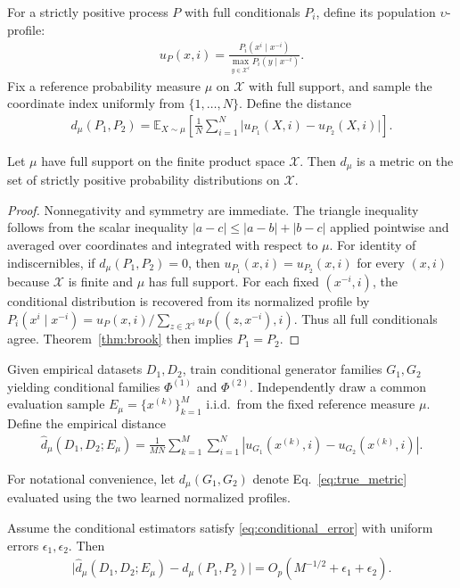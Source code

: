 \documentclass[runningheads]{llncs}
\def\EQSP{3pt}
\newcommand{\cgather}[2][\EQSP]{\begingroup\setlength\abovedisplayskip{#1}\setlength\belowdisplayskip{#1}\begin{gather} #2 \end{gather}\endgroup\noindent}
\begin{document}
For a strictly positive process $P$ with full conditionals $P_i$, define its population $\upsilon$-profile:
\cgather{
u_P(x,i)
=
\frac{
P_i(x^i\mid x^{-i})
}{
\max_{y\in\mathcal{X}^i} P_i(y\mid x^{-i})
}.
}
Fix a reference probability measure $\mu$ on $\mathcal{X}$ with full
support, and sample the coordinate index uniformly from
$\{1,\dots,N\}$. Define the distance
\cgather{
d_{\mu}(P_1,P_2)
=
\mathbb{E}_{X\sim\mu}
\left[
\frac{1}{N}\sum_{i=1}^{N}
\lvert u_{P_1}(X,i) - u_{P_2}(X,i)\rvert
\right].
\label{eq:true_metric}
}

\begin{theorem}
Let $\mu$ have full support on the finite product space $\mathcal{X}$.
Then $d_{\mu}$ is a metric on the set of strictly positive probability
distributions on $\mathcal{X}$.
\end{theorem}

\begin{proof}
Nonnegativity and symmetry are immediate. The triangle inequality follows from the scalar inequality
$\lvert a-c\rvert \le \lvert a-b\rvert + \lvert b-c\rvert$ applied pointwise and averaged over coordinates and integrated with respect to $\mu$.
For identity of indiscernibles, if $d_{\mu}(P_1,P_2)=0$, then
$u_{P_1}(x,i)=u_{P_2}(x,i)$ for every $(x,i)$ because $\mathcal{X}$ is
finite and $\mu$ has full support. For each fixed
$(x^{-i},i)$, the conditional distribution is recovered from its normalized
profile by
$P_i(x^i\mid x^{-i})=u_P(x,i)/\sum_{z\in\mathcal{X}^i}u_P((z,x^{-i}),i)$.
Thus all full conditionals agree. Theorem~\ref{thm:brook} then implies $P_1=P_2$.
\end{proof}

Given empirical datasets $D_1,D_2$, train conditional generator families
$G_1,G_2$ yielding conditional families $\Phi^{(1)}$ and $\Phi^{(2)}$.
Independently draw a common evaluation sample
$E_{\mu}=\{x^{(k)}\}_{k=1}^{M}$ i.i.d.\ from the fixed reference measure
$\mu$. Define the empirical distance
\cgather{
\widehat d_{\mu}(D_1,D_2;E_{\mu})
=
\frac{1}{MN}
\sum_{k=1}^{M}
\sum_{i=1}^{N}
\left\lvert
u_{G_1}(x^{(k)},i)-u_{G_2}(x^{(k)},i)
\right\rvert.
\label{eq:empirical_metric}
}

For notational convenience, let $d_{\mu}(G_1,G_2)$ denote
Eq.~\eqref{eq:true_metric} evaluated using the two learned normalized profiles.

\begin{theorem}
Assume the conditional estimators satisfy \eqref{eq:conditional_error} with
uniform errors $\epsilon_1,\epsilon_2$. Then
\cgather{
\big|
\widehat d_{\mu}(D_1,D_2;E_{\mu})-d_{\mu}(P_1,P_2)
\big|
=
O_p\!\left(
M^{-1/2}
+
\epsilon_1
+
\epsilon_2
\right).
}
\end{theorem}
\end{document}
